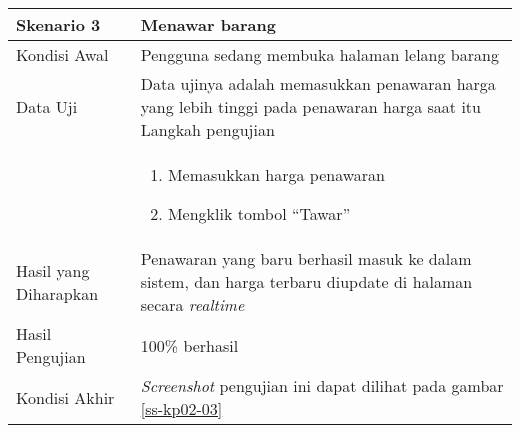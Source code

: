\begin{longtable}{|X|X|}
		
	\textbf{Skenario 3}
		& Menawar barang \\ \hline
	Kondisi Awal
		& Pengguna sedang membuka halaman lelang barang \\ \hline
	Data Uji
		& Data ujinya adalah memasukkan penawaran harga yang lebih tinggi pada penawaran harga saat itu
	Langkah pengujian \\ \hline
		& \begin{enumerate}
		\item Memasukkan harga penawaran
		\item Mengklik tombol ``Tawar''
	\end{enumerate} \\ \hline
	Hasil yang Diharapkan
		& Penawaran yang baru berhasil masuk ke dalam sistem, dan harga terbaru diupdate di halaman secara \textit{realtime} \\ \hline
	Hasil Pengujian
		& 100\% berhasil \\ \hline	
	Kondisi Akhir
		& \textit{Screenshot} pengujian ini dapat dilihat pada gambar \ref{ss-kp02-03}  \\ \hline	
		
\end{longtable}